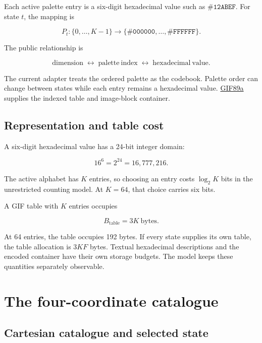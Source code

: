 \documentclass[
  11pt,
  a4paper,
]{article}
\begin{document}
Each active palette entry is a six-digit hexadecimal value such as
\(\mathtt{\#12ABEF}\). For state \(t\), the mapping is

\[
P_t:\{0,\ldots,K-1\}\longrightarrow
\{\mathtt{\#000000},\ldots,\mathtt{\#FFFFFF}\}.
\]

The public relationship is

\[
\mathrm{dimension}\;\longleftrightarrow\;
\mathrm{palette\ index}\;\longleftrightarrow\;
\mathrm{hexadecimal\ value}.
\]

The current adapter treats the ordered palette as the codebook. Palette
order can change between states while each entry remains a hexadecimal
value. \href{https://www.w3.org/Graphics/GIF/spec-gif89a.txt}{GIF89a}
supplies the indexed table and image-block container.

\hypertarget{representation-and-table-cost}{%
\subsection{Representation and table
cost}\label{representation-and-table-cost}}

A six-digit hexadecimal value has a 24-bit integer domain:

\[
16^6=2^{24}=16{,}777{,}216.
\]

The active alphabet has \(K\) entries, so choosing an entry costs
\(\log_2K\) bits in the unrestricted counting model. At \(K=64\), that
choice carries six bits.

A GIF table with \(K\) entries occupies

\[
B_{\mathrm{table}}=3K\ \text{bytes}.
\]

At 64 entries, the table occupies 192 bytes. If every state supplies its
own table, the table allocation is \(3KF\) bytes. Textual hexadecimal
descriptions and the encoded container have their own storage budgets.
The model keeps these quantities separately observable.

\hypertarget{the-four-coordinate-catalogue}{%
\section{The four-coordinate
catalogue}\label{the-four-coordinate-catalogue}}

\hypertarget{cartesian-catalogue-and-selected-state}{%
\subsection{Cartesian catalogue and selected
state}\label{cartesian-catalogue-and-selected-state}}
\end{document}

